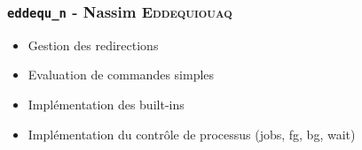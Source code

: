 \subsubsection{\texttt{eddequ\_n} - Nassim \textsc{Eddequiouaq}}

\begin{itemize}
    \item Gestion des redirections
    \item Evaluation de commandes simples
    \item Implémentation des built-ins
    \item Implémentation du contrôle de processus (jobs, fg, bg, wait)
\end{itemize}

